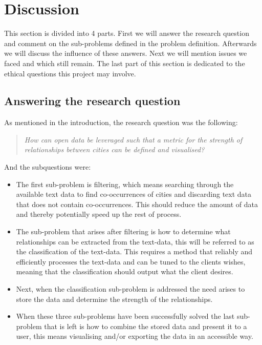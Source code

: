 \chapter{Discussion}

This section is divided into 4 parts. First we will answer the research question and comment on the sub-problems defined in the problem definition. Afterwards we will discuss the influence of these answers. Next we will mention issues we faced and which still remain. The last part of this section is dedicated to the ethical questions this project may involve.


\section{Answering the research question}

\todo{}

As mentioned in the introduction, the research question was the following:
\begin{quote} 
\centering 
\textit{How can open data be leveraged such that a metric for the strength of relationships between cities can be defined and visualised?}
\end{quote}

And the subquestions were:
\begin{itemize}
    \item The first sub-problem is filtering, which means searching through the available text data to find co-occurrences of cities and discarding text data that does not contain co-occurrences. This should reduce the amount of data and thereby potentially speed up the rest of process.
    \item The sub-problem that arises after filtering is how to determine what relationships can be extracted from the text-data, this will be referred to as the classification of the text-data. This requires a method that reliably and efficiently processes the text-data and can be tuned to the clients wishes, meaning that the classification should output what the client desires. 
    \item Next, when the classification sub-problem is addressed the need arises to store the data and determine the strength of the relationships. 
    \item When these three sub-problems have been successfully solved the last sub-problem that is left is how to combine the stored data and present it to a user, this means visualising and/or exporting the data in an accessible way.
\end{itemize}

